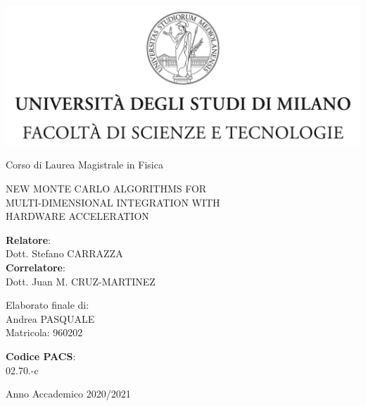 \documentclass[11pt,a4paper]{book}
\begin{document}
	
\thispagestyle{empty}

\begin{center}
\includegraphics{../images/tesiSCIENZE_TECNOLOGIE.jpg}
\end{center}
\begin{center}
	{\LARGE Corso di Laurea Magistrale in Fisica}
\end{center}
\begin{center}
	\vspace{3cm}
	{\Large NEW MONTE CARLO ALGORITHMS  FOR\\MULTI-DIMENSIONAL  INTEGRATION  WITH\\HARDWARE ACCELERATION \\} 
\end{center}
\par
\vspace{3 cm}
\begin{flushleft}  		 
	\textbf{Relatore}:\\ {Dott. Stefano CARRAZZA}\\
	\textbf{Correlatore}:\\ {Dott. Juan M. CRUZ-MARTINEZ}\\
\end{flushleft}
\vspace{1 cm}
\begin{flushright}
	Elaborato finale di:\\ Andrea PASQUALE\\ Matricola: 960202\\
\end{flushright}
\begin{flushright}
	\textbf{Codice PACS}: \\ 02.70.-c
\end{flushright}
\vfill
\begin{center}
	{\large Anno Accademico 2020/2021}
\end{center}

\tableofcontents







\nocite{*}

\appendix

\printbibliography
\end{document}
